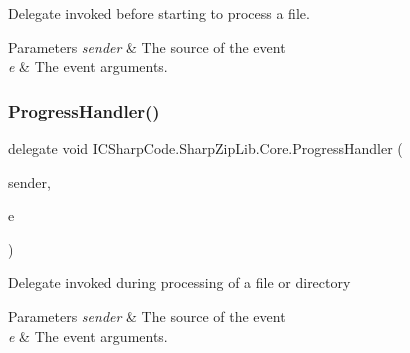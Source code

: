 Delegate invoked before starting to process a file. 


\begin{DoxyParams}{Parameters}
{\em sender} & The source of the event\\
\hline
{\em e} & The event arguments.\\
\hline
\end{DoxyParams}
\mbox{\label{namespace_i_c_sharp_code_1_1_sharp_zip_lib_1_1_core_a55f409bd1114da81c14d18c4d8682968}} 
\subsubsection{\texorpdfstring{Progress\+Handler()}{ProgressHandler()}}
{\footnotesize\ttfamily delegate void I\+C\+Sharp\+Code.\+Sharp\+Zip\+Lib.\+Core.\+Progress\+Handler (\begin{DoxyParamCaption}\item[{object}]{sender,  }\item[{\hyperlink{class_i_c_sharp_code_1_1_sharp_zip_lib_1_1_core_1_1_progress_event_args}{Progress\+Event\+Args}}]{e }\end{DoxyParamCaption})}



Delegate invoked during processing of a file or directory 


\begin{DoxyParams}{Parameters}
{\em sender} & The source of the event\\
\hline
{\em e} & The event arguments.\\
\hline
\end{DoxyParams}

